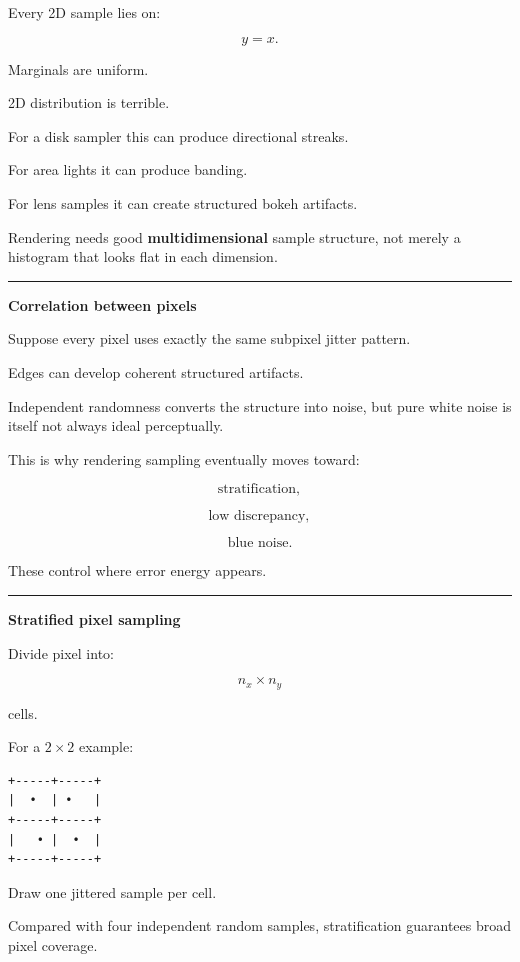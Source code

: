 Every 2D sample lies on:

\[
y=x.
\]

Marginals are uniform.

2D distribution is terrible.

For a disk sampler this can produce directional streaks.

For area lights it can produce banding.

For lens samples it can create structured bokeh artifacts.

Rendering needs good \textbf{multidimensional} sample structure, not merely a histogram that looks flat in each dimension.

\begin{center}\rule{0.5\linewidth}{0.5pt}\end{center}

\textbf{Correlation between pixels}

Suppose every pixel uses exactly the same subpixel jitter pattern.

Edges can develop coherent structured artifacts.

Independent randomness converts the structure into noise, but pure white noise is itself not always ideal perceptually.

This is why rendering sampling eventually moves toward:

\[
\text{stratification},
\]

\[
\text{low discrepancy},
\]

\[
\text{blue noise}.
\]

These control where error energy appears.

\begin{center}\rule{0.5\linewidth}{0.5pt}\end{center}

\textbf{Stratified pixel sampling}

Divide pixel into:

\[
n_x\times n_y
\]

cells.

For a \(2\times2\) example:

\begin{verbatim}
+-----+-----+
|  •  | •   |
+-----+-----+
|   • |  •  |
+-----+-----+
\end{verbatim}

Draw one jittered sample per cell.

Compared with four independent random samples, stratification guarantees broad pixel coverage.

